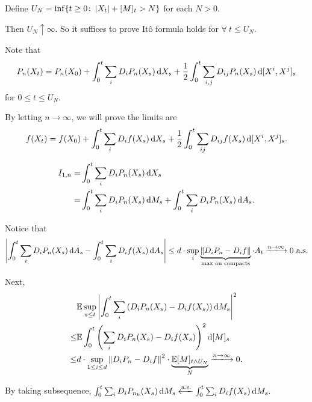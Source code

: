 
Define $U_N = \inf\{t \geq 0\colon \left|  X_t  \right|+ [M]_{t} > N\}$ for each $N >0$.

Then $U_N \uparrow \infty$. So it suffices to prove It\^o formula holds for $\forall~ t \leq U_N$.

Note that $$P_n(X_t) = P_n(X_0) + \int_{0}^{t}\sum_{i} D_i P_n(X_s) \mathop{}\!\mathrm{d}  X_s + \frac{1}{2} \int_{0}^{t} \sum_{i,j} D_{ij}P_n(X_s) \mathop{}\!\mathrm{d} [X^i,X^j]_s$$ for $0 \leq t \leq U_N$.

By letting $n \to \infty$, we will prove the limits are 
$$
f(X_t) = f(X_0) + \int_{0}^{t}\sum_{i} D_i f(X_s) \mathop{}\!\mathrm{d} X_s + \frac{1}{2} \int_{0}^{t} \sum_{ij}D_{ij}f(X_s) \mathop{}\!\mathrm{d} [X^i,X^j]_s.
$$

$$
\begin{aligned}
    I_{1,n}=&\int_{0}^{t} \sum_i D_i P_n(X_s) \mathop{}\!\mathrm{d} X_s \\
    =& \int_0^t \sum_i D_i P_n(X_s) \mathop{}\!\mathrm{d} M_s + \int_0^t \sum_i D_i P_n(X_s) \mathop{}\!\mathrm{d} A_s.
\end{aligned}
$$

Notice that 
$$
    \abs{ \int_0^t \sum_i D_i P_n (X_s) \diff A_s - \int_0^t \sum_i D_i f(X_s) \diff  A_s } \leq d\cdot \sup_{i} \underbrace{\norm{ D_iP_n - D_i f }}_{\text{max on compacts}}\cdot A_t \xlongrightarrow{n \to \infty} 0 \text{ a.s.}
$$

Next,
$$
    \begin{aligned}
    &\mathbb{E} \sup_{s \leq t} \abs{ \int_0^t \sum_i \left( D_i P_n(X_s) - D_i f(X_s) \right) \diff  M_s }^2 \\
    \leq & \mathbb{E}\int_0^t \left( \sum_i D_i P_n(X_s) - D_i f(X_s) \right)^2 \diff [M]_s \\
    \leq & d \cdot \sup_{1 \leq i \leq d}\norm{ D_iP_n - D_i f }^2 \cdot \underbrace{\mathbb{E}[M]_{t \wedge U_N}}_{N} \xlongrightarrow{n \to \infty} 0.
    \end{aligned}
$$

By taking subsequence, $\int_0^t \sum_i D_i P_{n_k}(X_s) \diff  M_s \xlongleftarrow{\text{a.s.}}\int_0^t \sum_i D_i f(X_s) \diff  M_s.$

